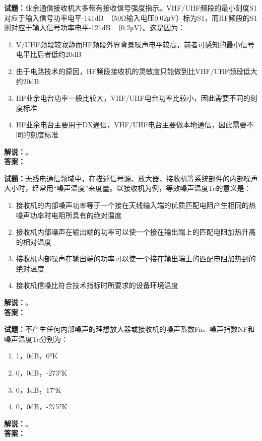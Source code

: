 \documentclass{ctexbook}
\begin{document}
\noindent\textbf{试题：}业余通信接收机大多带有接收信号强度指示。VHF/UHF频段的最小刻度S1对应于输入信号功率电平-141\unit[qualifier-mode=combine]{\deci\bel{}}（50Ω输入电压0.02μV）标为S1，而HF频段的S1则对应于输入信号功率电平-121\unit[qualifier-mode=combine]{\deci\bel{}}（0.2μV）。这是因为：
\begin{enumerate}[leftmargin=3em]
  \item V/UHF频段较寂静而HF频段外界背景噪声电平较高，前者可感知的最小信号电平比后者低约20dB
  \item 由于电路技术的原因，HF频段接收机的灵敏度只能做到比VHF/UHF频段低大约20dB
  \item HF业余电台功率一般比较大，VHF/UHF电台功率比较小，因此需要不同的刻度标准
  \item HF业余电台主要用于DX通信，VHF/UHF电台主要做本地通信，因此需要不同的刻度标准
\end{enumerate}
\noindent\textbf{解说：}\textbf{}。\\\noindent\textbf{答案：}

\vspace{\baselineskip}

\noindent\textbf{试题：}无线电通信领域中，在描述信号源、放大器、接收机等系统部件的内部噪声大小时，经常用“噪声温度”来度量。以接收机为例，等效噪声温度Te的意义是：
\begin{enumerate}[leftmargin=3em]
  \item 接收机的内部噪声功率等于一个接在天线输入端的优质匹配电阻产生相同的热噪声功率时电阻所具有的绝对温度
  \item 接收机内部噪声在输出端的功率可以使一个接在输出端上的匹配电阻加热升高的相对温度
  \item 接收机内部噪声在输出端的功率可以使一个接在输出端上的匹配电阻加热到的绝对温度
  \item 接收机信噪比符合技术指标时所要求的设备环境温度
\end{enumerate}
\noindent\textbf{解说：}\textbf{}。\\\noindent\textbf{答案：}

\vspace{\baselineskip}

\noindent\textbf{试题：}不产生任何内部噪声的理想放大器或接收机的噪声系数Fn、噪声指数NF和噪声温度Te分别为：
\begin{enumerate}[leftmargin=3em]
  \item 1，0dB，0°K
  \item 0，0dB，-273°K
  \item 0，1dB，17°K
  \item 0，0dB，-275°K
\end{enumerate}
\noindent\textbf{解说：}\textbf{}。\\\noindent\textbf{答案：}
\end{document}
